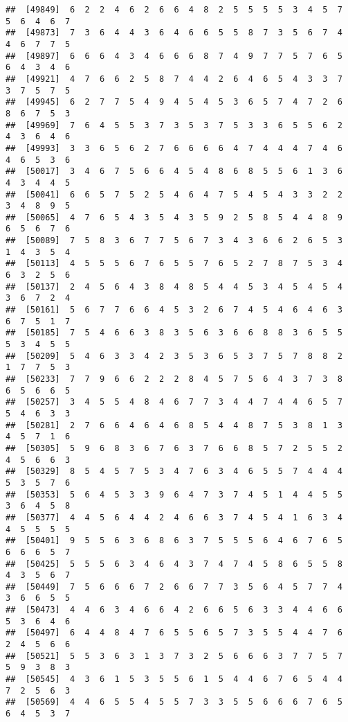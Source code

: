 \documentclass[
]{book}
\begin{document}
\begin{verbatim}
##  [49849]  6  2  2  4  6  2  6  6  4  8  2  5  5  5  5  3  4  5  7  5  6  4  6  7
##  [49873]  7  3  6  4  4  3  6  4  6  6  5  5  8  7  3  5  6  7  4  4  6  7  7  5
##  [49897]  6  6  6  4  3  4  6  6  6  8  7  4  9  7  7  5  7  6  5  6  4  3  4  6
##  [49921]  4  7  6  6  2  5  8  7  4  4  2  6  4  6  5  4  3  3  7  3  7  5  7  5
##  [49945]  6  2  7  7  5  4  9  4  5  4  5  3  6  5  7  4  7  2  6  8  6  7  5  3
##  [49969]  7  6  4  5  5  3  7  3  5  3  7  5  3  3  6  5  5  6  2  4  3  6  4  6
##  [49993]  3  3  6  5  6  2  7  6  6  6  6  4  7  4  4  4  7  4  6  4  6  5  3  6
##  [50017]  3  4  6  7  5  6  6  4  5  4  8  6  8  5  5  6  1  3  6  4  3  4  4  5
##  [50041]  6  6  5  7  5  2  5  4  6  4  7  5  4  5  4  3  3  2  2  3  4  8  9  5
##  [50065]  4  7  6  5  4  3  5  4  3  5  9  2  5  8  5  4  4  8  9  6  5  6  7  6
##  [50089]  7  5  8  3  6  7  7  5  6  7  3  4  3  6  6  2  6  5  3  1  4  3  5  4
##  [50113]  4  5  5  5  6  7  6  5  5  7  6  5  2  7  8  7  5  3  4  6  3  2  5  6
##  [50137]  2  4  5  6  4  3  8  4  8  5  4  4  5  3  4  5  4  5  4  3  6  7  2  4
##  [50161]  5  6  7  7  6  6  4  5  3  2  6  7  4  5  4  6  4  6  3  6  7  5  1  7
##  [50185]  7  5  4  6  6  3  8  3  5  6  3  6  6  8  8  3  6  5  5  5  3  4  5  5
##  [50209]  5  4  6  3  3  4  2  3  5  3  6  5  3  7  5  7  8  8  2  1  7  7  5  3
##  [50233]  7  7  9  6  6  2  2  2  8  4  5  7  5  6  4  3  7  3  8  6  5  6  6  5
##  [50257]  3  4  5  5  4  8  4  6  7  7  3  4  4  7  4  4  6  5  7  5  4  6  3  3
##  [50281]  2  7  6  6  4  6  4  6  8  5  4  4  8  7  5  3  8  1  3  4  5  7  1  6
##  [50305]  5  9  6  8  3  6  7  6  3  7  6  6  8  5  7  2  5  5  2  4  5  6  6  3
##  [50329]  8  5  4  5  7  5  3  4  7  6  3  4  6  5  5  7  4  4  4  5  3  5  7  6
##  [50353]  5  6  4  5  3  3  9  6  4  7  3  7  4  5  1  4  4  5  5  3  6  4  5  8
##  [50377]  4  4  5  6  4  4  2  4  6  6  3  7  4  5  4  1  6  3  4  4  5  5  5  5
##  [50401]  9  5  5  6  3  6  8  6  3  7  5  5  5  6  4  6  7  6  5  6  6  6  5  7
##  [50425]  5  5  5  6  3  4  6  4  3  7  4  7  4  5  8  6  5  5  8  4  3  5  6  7
##  [50449]  7  5  6  6  6  7  2  6  6  7  7  3  5  6  4  5  7  7  4  3  6  6  5  5
##  [50473]  4  4  6  3  4  6  6  4  2  6  6  5  6  3  3  4  4  6  6  5  3  6  4  6
##  [50497]  6  4  4  8  4  7  6  5  5  6  5  7  3  5  5  4  4  7  6  2  4  5  6  6
##  [50521]  5  5  3  6  3  1  3  7  3  2  5  6  6  6  3  7  7  5  7  5  9  3  8  3
##  [50545]  4  3  6  1  5  3  5  5  6  1  5  4  4  6  7  6  5  4  4  7  2  5  6  3
##  [50569]  4  4  6  5  5  4  5  5  7  3  3  5  5  6  6  6  7  6  5  6  4  5  3  7

\end{verbatim}
\end{document}
